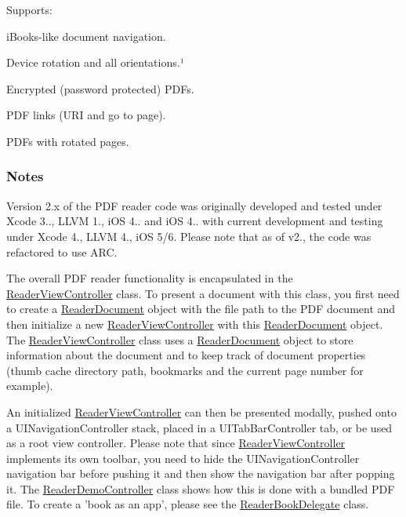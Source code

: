 Supports\-:


\begin{DoxyItemize}
\item i\-Books-\/like document navigation.
\item Device rotation and all orientations.\-¹
\item Encrypted (password protected) P\-D\-Fs.
\item P\-D\-F links (U\-R\-I and go to page).
\item P\-D\-Fs with rotated pages.
\end{DoxyItemize}

\subsubsection*{Notes}

Version 2.\-x of the P\-D\-F reader code was originally developed and tested under Xcode 3.., L\-L\-V\-M 1., i\-O\-S 4.. and i\-O\-S 4.. with current development and testing under Xcode 4., L\-L\-V\-M 4., i\-O\-S 5/6. Please note that as of v2., the code was refactored to use A\-R\-C.

The overall P\-D\-F reader functionality is encapsulated in the \hyperlink{interface_reader_view_controller}{Reader\-View\-Controller} class. To present a document with this class, you first need to create a \hyperlink{interface_reader_document}{Reader\-Document} object with the file path to the P\-D\-F document and then initialize a new \hyperlink{interface_reader_view_controller}{Reader\-View\-Controller} with this \hyperlink{interface_reader_document}{Reader\-Document} object. The \hyperlink{interface_reader_view_controller}{Reader\-View\-Controller} class uses a \hyperlink{interface_reader_document}{Reader\-Document} object to store information about the document and to keep track of document properties (thumb cache directory path, bookmarks and the current page number for example).

An initialized \hyperlink{interface_reader_view_controller}{Reader\-View\-Controller} can then be presented modally, pushed onto a U\-I\-Navigation\-Controller stack, placed in a U\-I\-Tab\-Bar\-Controller tab, or be used as a root view controller. Please note that since \hyperlink{interface_reader_view_controller}{Reader\-View\-Controller} implements its own toolbar, you need to hide the U\-I\-Navigation\-Controller navigation bar before pushing it and then show the navigation bar after popping it. The \hyperlink{interface_reader_demo_controller}{Reader\-Demo\-Controller} class shows how this is done with a bundled P\-D\-F file. To create a 'book as an app', please see the \hyperlink{interface_reader_book_delegate}{Reader\-Book\-Delegate} class.

